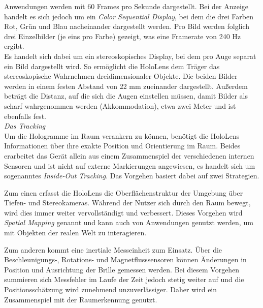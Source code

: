 Anwendungen werden mit 60 Frames pro Sekunde dargestellt. Bei der Anzeige handelt es sich jedoch um ein \textit{Color Sequential Display}, bei dem die drei Farben Rot, Grün und Blau nacheinander dargestellt werden. Pro Bild werden folglich drei Einzelbilder (je eins pro Farbe) gezeigt, was eine Framerate von 240 Hz ergibt.\\

Es handelt sich dabei um ein stereoskopisches Display, bei dem pro Auge separat ein Bild dargestellt wird. So ermöglicht die HoloLens dem Träger das stereoskopische Wahrnehmen dreidimensionaler Objekte. Die beiden Bilder werden in einem festen Abstand von 22 mm zueinander dargestellt. Außerdem beträgt die Distanz, auf die sich die Augen einstellen müssen, damit Bilder als scharf wahrgenommen werden (Akkommodation), etwa zwei Meter und ist ebenfalls fest.\\

\vspace{4px}
\textit{Das Tracking}\\
Um die Hologramme im Raum verankern zu können, benötigt die HoloLens Informationen über ihre exakte Position und Orientierung im Raum. Beides erarbeitet das Gerät allein aus einem Zusammenspiel der verschiedenen internen Sensoren und ist nicht auf externe Markierungen angewiesen, es handelt sich um sogenanntes \textit{Inside-Out Tracking}. Das Vorgehen basiert dabei auf zwei Strategien.
\par
\noindent\hspace*{5mm}
Zum einen erfasst die HoloLens die Oberflächenstruktur der Umgebung über Tiefen- und Stereokameras. Während der Nutzer sich durch den Raum bewegt, wird dies immer weiter vervollständigt und verbessert. Dieses Vorgehen wird \textit{Spatial Mapping} genannt und kann auch von Anwendungen genutzt werden, um mit Objekten der realen Welt zu interagieren.
\par
\noindent\hspace*{5mm}
Zum anderen kommt eine inertiale Messeinheit zum Einsatz. Über die Beschleunigungs-, Rotations- und Magnetflusssensoren können Änderungen in Position und Ausrichtung der Brille gemessen werden. Bei diesem Vorgehen summieren sich Messfehler im Laufe der Zeit jedoch stetig weiter auf und die Positionsschätzung wird zunehmend unzuverlässiger. Daher wird ein Zusammenspiel mit der Raumerkennung genutzt.

